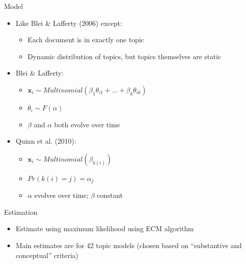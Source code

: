 \documentclass[english]{beamer}
\begin{document}
\begin{frame}{Model}
\begin{itemize}
    \setlength{\itemsep}{1.1em}
    \item Like Blei \& Lafferty (2006) except:
    \vspace{5pt}
    \begin{itemize}
        \setlength{\itemsep}{0.4em}
        \item Each document is in exactly one topic
        \item Dynamic distribution of topics, but topics themselves are static
    \end{itemize}
    \item Blei \& Lafferty: 
    \vspace{5pt}
    \begin{itemize}
        \setlength{\itemsep}{0.4em}
        \item $\textbf{x}_i \sim Multinomial (\beta_1 \theta_{i1} + ... + \beta_k \theta_{ik})$
        \item $\theta_i \sim F (\alpha)$
        \item $\beta$ and $\alpha$ both evolve over time
    \end{itemize}
    \item Quinn et al. (2010):
    \vspace{5pt}
    \begin{itemize}
        \setlength{\itemsep}{0.4em}
        \item $\textbf{x}_i \sim Multinomial (\beta_{k(i)})$
        \item $Pr(k(i) = j) = \alpha_j$
        \item $\alpha$ evolves over time; $\beta$ constant
    \end{itemize}
\end{itemize}
\end{frame}

\begin{frame}{Estimation}
\begin{itemize}
        \setlength{\itemsep}{0.8em}
    \item Estimate using maximum likelihood using ECM algorithm
    \item Main estimates are for 42 topic models (chosen based on ``substantive and conceptual'' criteria)
\end{itemize}
\end{frame}
\end{document}
